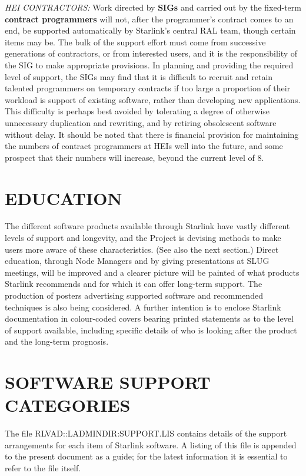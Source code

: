 \documentclass[nolof,11pt,noabs]{starlink}
\begin{document}
\textit{HEI CONTRACTORS:} \hspace{2ex} Work directed by \textbf{SIGs} and carried out
by the fixed-term \textbf{contract programmers}
will not, after the programmer's
contract comes to an end, be supported
automatically by Starlink's central RAL team,
though certain items may be.  The bulk of the
support effort must come from successive generations of contractors, or from
interested users, and it is the responsibility of the
SIG to make appropriate provisions.  In planning and providing the required
level of support, the SIGs may find that it is
difficult to recruit and retain talented
programmers on temporary contracts if too large a proportion of
their workload is support of existing software, rather than
developing new applications.  This difficulty is
perhaps best avoided by tolerating a degree of
otherwise unnecessary duplication and rewriting, and by
retiring obsolescent software without delay.  It should be noted
that there is financial provision for maintaining the numbers of
contract programmers at HEIs well into the future, and some prospect
that their numbers will increase, beyond the current level of 8.

\section{EDUCATION}
The different software products available through Starlink have
vastly different levels of support and longevity, and
the Project is devising methods to make users more aware of these
characteristics.  (See also the next section.)
Direct education, through Node Managers
and by giving presentations at SLUG meetings, will
be improved and a clearer picture will be painted of what
products Starlink recommends and for which it can offer long-term support.
The production of
posters advertising supported software and recommended
techniques is also being considered.  A further intention
is to enclose Starlink documentation in
colour-coded covers bearing printed statements as to the
level of support available, including specific details of
who is looking after the product and the long-term prognosis.

\section{SOFTWARE SUPPORT CATEGORIES}
The file RLVAD::LADMINDIR:SUPPORT.LIS contains details of the support
arrangements for each item of Starlink software.  A listing of this
file is appended to the present document as a guide;  for the latest
information it is essential to refer to the file itself.
\end{document}
